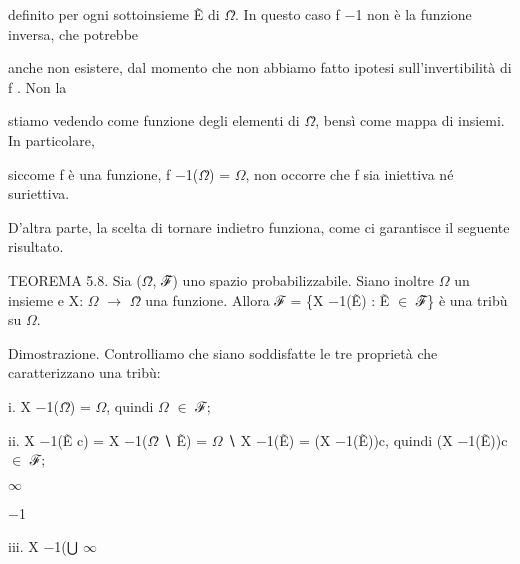 \documentclass[a4paper,portrait,12pt]{article}
\begin{document}
\begin{flushleft}
definito per ogni sottoinsieme Ẽ di $\Omega$̃. In questo caso f $-$1 non \`{e} la funzione inversa, che potrebbe
\end{flushleft}


\begin{flushleft}
anche non esistere, dal momento che non abbiamo fatto ipotesi sull'invertibilit\`{a} di f . Non la
\end{flushleft}


\begin{flushleft}
stiamo vedendo come funzione degli elementi di $\Omega$̃, bensì come mappa di insiemi. In particolare,
\end{flushleft}


\begin{flushleft}
siccome f \`{e} una funzione, f $-$1($\Omega$̃) = $\Omega$, non occorre che f sia iniettiva n\'{e} suriettiva.
\end{flushleft}


\begin{flushleft}
D'altra parte, la scelta di tornare indietro funziona, come ci garantisce il seguente risultato.
\end{flushleft}


\begin{flushleft}
TEOREMA 5.8. Sia ($\Omega$̃, ℱ̃) uno spazio probabilizzabile. Siano inoltre $\Omega$ un insieme e X: $\Omega$ $\rightarrow$ $\Omega$̃ una funzione. Allora ℱ = \{X $-$1(Ẽ) : Ẽ $\in$ ℱ̃\} \`{e} una tribù su $\Omega$.
\end{flushleft}


\begin{flushleft}
Dimostrazione. Controlliamo che siano soddisfatte le tre propriet\`{a} che caratterizzano una tribù:
\end{flushleft}


\begin{flushleft}
i. X $-$1($\Omega$̃) = $\Omega$, quindi $\Omega$ $\in$ ℱ;
\end{flushleft}


\begin{flushleft}
ii. X $-$1(Ẽ c) = X $-$1($\Omega$̃ ∖ Ẽ) = $\Omega$ ∖ X $-$1(Ẽ) = (X $-$1(Ẽ))c, quindi (X $-$1(Ẽ))c $\in$ ℱ;
\end{flushleft}


$\infty$


$-$1


\begin{flushleft}
iii. X $-$1(⋃ $\infty$
\end{flushleft}
\end{document}
